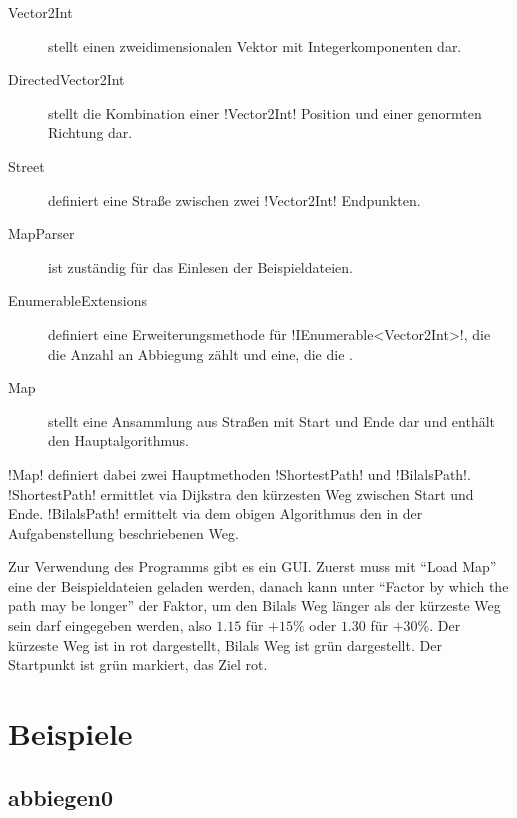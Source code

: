 \documentclass{article}
\begin{document}
\begin{description}
    \item[Vector2Int] stellt einen zweidimensionalen Vektor mit Integerkomponenten dar.
    \item[DirectedVector2Int] stellt die Kombination einer !Vector2Int! Position und einer genormten Richtung dar.
    \item[Street] definiert eine Straße zwischen zwei !Vector2Int! Endpunkten.
    \item[MapParser] ist zuständig für das Einlesen der Beispieldateien.
    \item[EnumerableExtensions] definiert eine Erweiterungsmethode für !IEnumerable<Vector2Int>!, die die Anzahl an Abbiegung zählt und eine, die die .
    \item[Map] stellt eine Ansammlung aus Straßen mit Start und Ende dar und enthält den Hauptalgorithmus. 
\end{description}

!Map! definiert dabei zwei Hauptmethoden
!ShortestPath! und !BilalsPath!.
!ShortestPath! ermittlet via Dijkstra den kürzesten Weg zwischen Start und Ende.
!BilalsPath! ermittelt via dem obigen Algorithmus den in der Aufgabenstellung beschriebenen Weg.

Zur Verwendung des Programms gibt es ein GUI.
Zuerst muss mit ``Load Map'' eine der Beispieldateien geladen werden, danach kann unter ``Factor by which the path may be longer'' der Faktor, um den Bilals Weg länger als der kürzeste Weg sein darf eingegeben werden, also \(1.15\) für \(+15\%\) oder \(1.30\) für \(+30\%\).
Der kürzeste Weg ist in rot dargestellt, Bilals Weg ist grün dargestellt.
Der Startpunkt ist grün markiert, das Ziel rot.

\section{Beispiele}

\subsection{abbiegen0}
\end{document}
